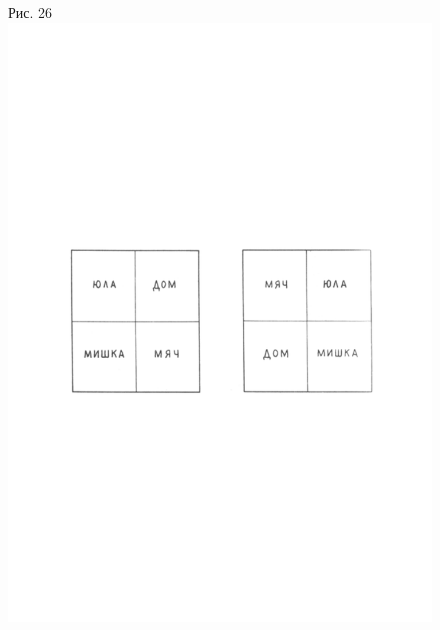 \documentclass[a5paper]{book}
\begin{document}
\begin{figure}
\centering
Рис. 26\includegraphics[width=\linewidth]{media/media/image23.png}
\end{figure}
\end{document}
